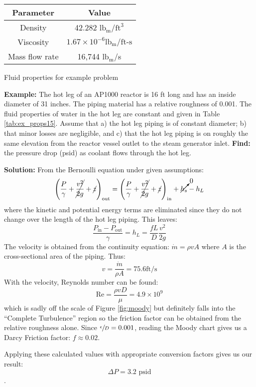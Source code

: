 \begin{margintable}
\begin{tabular}{|c|c|}
\hline
Parameter & Value \\
\hline
Density & 42.282 $\text{lb}_{\text{m}}/\text{ft}^3$ \\
\hline
Viscosity & $1.67 \times 10^{-6} \text{lb}_{\text{m}}/\text{ft-s}$ \\
\hline
Mass flow rate & 16,744 $\text{lb}_{\text{m}}$/s \\
\hline
\end{tabular}
\caption{Fluid properties for example problem}
\label{tab:ex_props15}
\end{margintable}

\begin{example}
\textbf{Example:} The hot leg of an AP1000 reactor is 16 ft long and has an inside diameter of 31 inches.  The piping material has a relative roughness of 0.001.  The fluid properties of water in the hot leg are constant and given in Table \ref{tab:ex_props15}.  Assume that a) the hot leg piping is of constant diameter; b) that minor losses are negligible, and c) that the hot leg piping is on roughly the same elevation from the reactor vessel outlet to the steam generator inlet. \textbf{Find:} the pressure drop (psid) as coolant flows through the hot leg.
\end{example}

\textbf{Solution:} 
From the Bernoulli equation under given assumptions:
$$\left(\frac{P}{\gamma} + \cancel{\frac{v^2}{2g}}+\cancel{z}\right)_{\text{out}} = \left(\frac{P}{\gamma} + \cancel{\frac{v^2}{2g}}+\cancel{z} \right)_{\text{in}} + \cancelto{0}{h_s} - h_L   $$
where the kinetic and potential energy terms are eliminated since they do not change over the length of the hot leg piping.  This leaves:
$$ \frac{P_{\text{in}}-P_{\text{out}}}{\gamma} = h_L = \frac{fL}{D}\frac{v^2}{2g}$$
The velocity is obtained from the continuity equation: $\dot{m}=\rho v A$ where $A$ is the cross-sectional area of the piping.  Thus:
$$v = \frac{\dot{m}}{\rho A} = 75.6 \text{ft/s}$$
With the velocity, Reynolds number can be found:
$$\text{Re} = \frac{\rho v D}{\mu} = 4.9\times 10^{9}$$
which is sadly off the scale of Figure \ref{fig:moody} but definitely falls into the ``Complete Turbulence'' region so the friction factor can be obtained from the relative roughness alone.  Since $\sfrac{\epsilon}{D} = 0.001$, reading the Moody chart gives us a Darcy Friction factor: $f \approx 0.02$.  

Applying these calculated values with appropriate conversion factors gives us our result:
$$\Delta P = 3.2 \text{ psid}$$.




